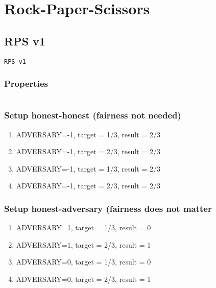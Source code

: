 \documentclass{article}
\begin{document}
\javastyle

\tableofcontents

\section{Rock-Paper-Scissors}

\subsection{RPS v1}

%
\begin{lstlisting}
RPS v1
\end{lstlisting}


\subsubsection{Properties}

\begin{equation}
\text{}
\label{prop:rps_v1}
\end{equation}

\subsubsection{Setup honest-honest (fairness not needed)}

\begin{enumerate}
\item ADVERSARY=-1, target = 1/3, result = 2/3
\item ADVERSARY=-1, target = 2/3, result = 2/3
\item ADVERSARY=-1, target = 1/3, result = 2/3
\item ADVERSARY=-1, target = 2/3, result = 2/3
\end{enumerate}

\subsubsection{Setup honest-adversary (fairness does not matter}

\begin{enumerate}
\item ADVERSARY=1, target = 1/3, result = 0
\item ADVERSARY=1, target = 2/3, result = 1
\item ADVERSARY=0, target = 1/3, result = 0
\item ADVERSARY=0, target = 2/3, result = 1
\end{enumerate}
\end{document}
